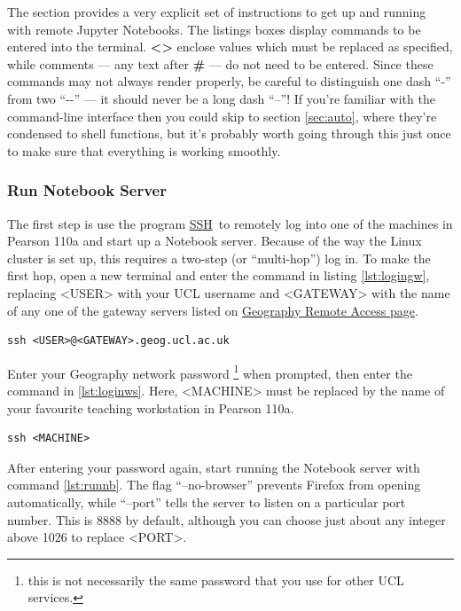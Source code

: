 \documentclass[a4paper]{article}
\begin{document}
The section provides a very explicit set of instructions to get up and running with remote Jupyter Notebooks.
The listings boxes display commands to be entered into the terminal. \textbf{\textless{}\textgreater{}} enclose values which must be replaced as specified, while comments --- any text after \textbf{\#} --- do not need to be entered.
Since these commands may not always render properly, be careful to distinguish one dash ``-'' from two ``-{}-'' --- it should never be a long dash ``--''!
If you're familiar with the command-line interface then you could skip to section \ref{sec:auto}, where they're condensed to shell functions, but it's probably worth going through this just once to make sure that everything is working smoothly.

\subsubsection{Run Notebook Server}
\label{sec:runnb}

The first step is use the program \href{http://linuxcommand.org/man_pages/ssh1.html}{SSH}~to remotely log into one of the machines in Pearson 110a and start up a Notebook server.
Because of the way the Linux cluster is set up, this requires a two-step (or ``multi-hop'') log in.
To make the first hop, open a new terminal and enter the command in listing \ref{lst:logingw}, replacing \textless{}USER\textgreater{} with your UCL username and \textless{}GATEWAY\textgreater{} with the name of any one of the gateway servers listed on \href{http://www.geog.ucl.ac.uk/resources/computer-support/linux-remote-access}{Geography Remote Access page}.

\begin{lstlisting}[caption={Login to gateway}, label={lst:logingw}]
ssh <USER>@<GATEWAY>.geog.ucl.ac.uk
\end{lstlisting}

Enter your Geography network password \footnote{this is not necessarily the same password that you use for other UCL services.} when prompted, then enter the command in \ref{lst:loginws}.
Here, \textless{}MACHINE\textgreater{} must be replaced by the name of your favourite teaching workstation in Pearson 110a.

\begin{lstlisting}[caption={Login to workstation}, label={lst:loginws}]
ssh <MACHINE>
\end{lstlisting}

After entering your password again, start running the Notebook server with command \ref{lst:runnb}.
The flag ``--no-browser'' prevents Firefox from opening automatically, while ``--port'' tells the server to listen on a particular port number.
This is 8888 by default, although you can choose just about any integer above 1026 to replace \textless{}PORT\textgreater{}.
\end{document}
